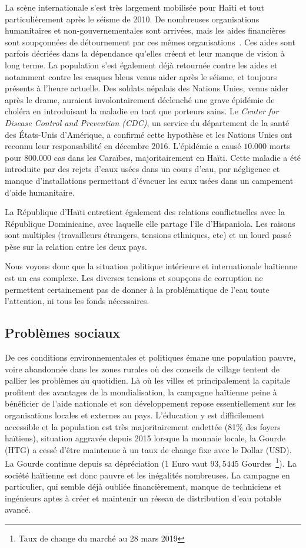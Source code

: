 \documentclass{EPL-master-thesis-covers-FR}
\begin{document}
				La scène internationale s'est très largement mobilisée pour Haïti et tout particulièrement après le séisme de 2010. De nombreuses organisations humanitaires et non-gouvernementales sont arrivées, mais les aides financières sont soupçonnées de détournement par ces mêmes organisations~\cite{ref:analyse_contextuelle_commune}. Ces aides sont parfois décriées dans la dépendance qu'elles créent et leur manque de vision à long terme. La population s'est également déjà retournée contre les aides et notamment contre les casques bleus venus aider après le séisme, et toujours présents à l'heure actuelle. Des soldats népalais des Nations Unies, venus aider après le drame, auraient involontairement déclenché une grave épidémie de choléra en introduisant la maladie en tant que porteurs sains. Le \emph{Center for Disease Control and Prevention (CDC)}, un service du département de la santé des \'Etats-Unis d'Amérique, a confirmé cette hypothèse et les Nations Unies ont reconnu leur responsabilité en décembre 2016. L'épidémie a causé $10.000$ morts pour $800.000$ cas dans les Caraïbes, majoritairement en Haïti. Cette maladie a été introduite par des rejets d'eaux usées dans un cours d'eau, par négligence et manque d'installations permettant d'évacuer les eaux usées dans un campement d'aide humanitaire.

				La République d'Haïti entretient également des relations conflictuelles avec la République Dominicaine, avec laquelle elle partage l'île d'Hispaniola. Les raisons sont multiples (travailleurs étrangers, tensions ethniques, etc) et un lourd passé pèse sur la relation entre les deux pays.

				Nous voyons donc que la situation politique intérieure et internationale haïtienne est un cas complexe. Les diverses tensions et soupçons de corruption ne permettent certainement pas de donner à la problématique de l'eau toute l'attention, ni tous les fonds nécessaires.

			\subsection*{Problèmes sociaux}

				De ces conditions environnementales et politiques émane une population pauvre, voire abandonnée dans les zones rurales où des conseils de village tentent de pallier les problèmes au quotidien. Là où les villes et principalement la capitale profitent des avantages de la mondialisation, la campagne haïtienne peine à bénéficier de l'aide nationale et son développement repose essentiellement sur les organisations locales et externes au pays. L'éducation y est difficilement accessible et la population est très majoritairement endettée (81\% des foyers haïtiens), situation aggravée depuis 2015 lorsque la monnaie locale, la Gourde (HTG) a cessé d'être maintenue à un taux de change fixe avec le Dollar (USD). La Gourde continue depuis sa dépréciation (1 Euro vaut $93,5445$ Gourdes~\footnote{Taux de change du marché au 28 mars 2019}). La société haïtienne est donc pauvre et les inégalités nombreuses. La campagne en particulier, qui semble déjà oubliée financièrement, manque de techniciens et ingénieurs aptes à créer et maintenir un réseau de distribution d'eau potable avancé.
\end{document}
